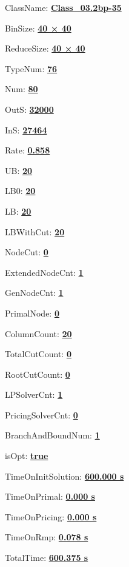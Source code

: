 \documentclass[11pt]{article}
\begin{document}
\pagestyle{empty}


ClassName: \underline{\textbf{Class_03.2bp-35}}
\par
BinSize: \underline{\textbf{40 × 40}}
\par
ReduceSize: \underline{\textbf{40 × 40}}
\par
TypeNum: \underline{\textbf{76}}
\par
Num: \underline{\textbf{80}}
\par
OutS: \underline{\textbf{32000}}
\par
InS: \underline{\textbf{27464}}
\par
Rate: \underline{\textbf{0.858}}
\par
UB: \underline{\textbf{20}}
\par
LB0: \underline{\textbf{20}}
\par
LB: \underline{\textbf{20}}
\par
LBWithCut: \underline{\textbf{20}}
\par
NodeCut: \underline{\textbf{0}}
\par
ExtendedNodeCnt: \underline{\textbf{1}}
\par
GenNodeCnt: \underline{\textbf{1}}
\par
PrimalNode: \underline{\textbf{0}}
\par
ColumnCount: \underline{\textbf{20}}
\par
TotalCutCount: \underline{\textbf{0}}
\par
RootCutCount: \underline{\textbf{0}}
\par
LPSolverCnt: \underline{\textbf{1}}
\par
PricingSolverCnt: \underline{\textbf{0}}
\par
BranchAndBoundNum: \underline{\textbf{1}}
\par
isOpt: \underline{\textbf{true}}
\par
TimeOnInitSolution: \underline{\textbf{600.000 s}}
\par
TimeOnPrimal: \underline{\textbf{0.000 s}}
\par
TimeOnPricing: \underline{\textbf{0.000 s}}
\par
TimeOnRmp: \underline{\textbf{0.078 s}}
\par
TotalTime: \underline{\textbf{600.375 s}}
\par
\newpage


\end{document}
